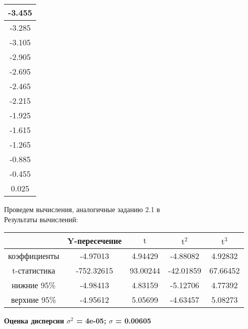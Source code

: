 \begin{center}
\begin{tabular}{ | c | }
        \hline
        -3.455 \\
        \hline
        -3.285 \\
        \hline
        -3.105 \\
        \hline
        -2.905 \\
        \hline
        -2.695 \\
        \hline
        -2.465 \\
        \hline
        -2.215 \\
        \hline
        -1.925 \\
        \hline
        -1.615 \\
        \hline
        -1.265 \\
        \hline
        -0.885 \\
        \hline
        -0.455 \\
        \hline
        0.025 \\
        \hline
    \end{tabular}
\end{center}

Проведем вычисления, аналогичные заданию 2.1 в \\
Результаты вычислений:

\renewcommand{\arraystretch}{0.65}
\begin{center}
    \begin{tabular}{ | c | c | c | c | c | } 
      \hline
       & Y-пересечение & $\textrm{t}$ & $\textrm{t}^2$ & $\textrm{t}^3$ \\
      \hline
      коэффициенты & -4.97013 & 4.94429 & -4.88082 & 4.92832 \\ 
       \hline 
      t-статистика & -752.32615 & 93.00244 & -42.01859 & 67.66452 \\ 
       \hline 
      нижние 95\% & -4.98413 & 4.83159 & -5.12706 & 4.77392 \\ 
       \hline 
      верхние 95\% & -4.95612 & 5.05699 & -4.63457 & 5.08273 \\ 
       \hline 
    \end{tabular}
\end{center}

\vspace{0.75\baselineskip}

\begin{center}
    \textbf{Оценка дисперсии $\sigma^2$ = 4e-05; $\sigma$ = 0.00605}
\end{center}

\vspace{0.75\baselineskip}

